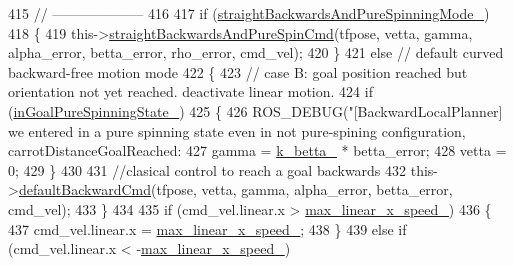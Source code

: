 \begin{DoxyCode}
415                 \textcolor{comment}{// --------------------}
416 
417                 \textcolor{keywordflow}{if} (\hyperlink{classcl__move__base__z_1_1backward__local__planner_1_1BackwardLocalPlanner_a04febb67563add6f715051a94aed1b9b}{straightBackwardsAndPureSpinningMode\_})
418                 \{
419                     this->\hyperlink{classcl__move__base__z_1_1backward__local__planner_1_1BackwardLocalPlanner_a6069866b4a3150883de3212d8e43e8f8}{straightBackwardsAndPureSpinCmd}(tfpose, vetta, 
      gamma, alpha\_error, betta\_error, rho\_error, cmd\_vel);
420                 \}
421                 \textcolor{keywordflow}{else} \textcolor{comment}{// default curved backward-free motion mode}
422                 \{
423                     \textcolor{comment}{// case B: goal position reached but orientation not yet reached. deactivate linear
       motion.}
424                     \textcolor{keywordflow}{if} (\hyperlink{classcl__move__base__z_1_1backward__local__planner_1_1BackwardLocalPlanner_ae4d7254afd19ae1f7bd8eac9f5d58b9a}{inGoalPureSpinningState\_})
425                     \{
426                         ROS\_DEBUG(\textcolor{stringliteral}{"[BackwardLocalPlanner] we entered in a pure spinning state even in not
       pure-spining configuration, carrotDistanceGoalReached: %
427                         gamma = \hyperlink{classcl__move__base__z_1_1backward__local__planner_1_1BackwardLocalPlanner_a9f257183d87f1d732cb7e404f09905ad}{k\_betta\_} * betta\_error;
428                         vetta = 0;
429                     \}
430 
431                     \textcolor{comment}{//clasical control to reach a goal backwards}
432                     this->\hyperlink{classcl__move__base__z_1_1backward__local__planner_1_1BackwardLocalPlanner_a1ebd69a028a22e3573e98f89d593f97d}{defaultBackwardCmd}(tfpose, vetta, gamma, alpha\_error, 
      betta\_error, cmd\_vel);
433                 \}
434 
435                 \textcolor{keywordflow}{if} (cmd\_vel.linear.x > \hyperlink{classcl__move__base__z_1_1backward__local__planner_1_1BackwardLocalPlanner_ae4399072e9ae9cc60d8837860dc4807b}{max\_linear\_x\_speed\_})
436                 \{
437                     cmd\_vel.linear.x = \hyperlink{classcl__move__base__z_1_1backward__local__planner_1_1BackwardLocalPlanner_ae4399072e9ae9cc60d8837860dc4807b}{max\_linear\_x\_speed\_};
438                 \}
439                 \textcolor{keywordflow}{else} \textcolor{keywordflow}{if} (cmd\_vel.linear.x < -\hyperlink{classcl__move__base__z_1_1backward__local__planner_1_1BackwardLocalPlanner_ae4399072e9ae9cc60d8837860dc4807b}{max\_linear\_x\_speed\_})
}
\end{DoxyCode}
